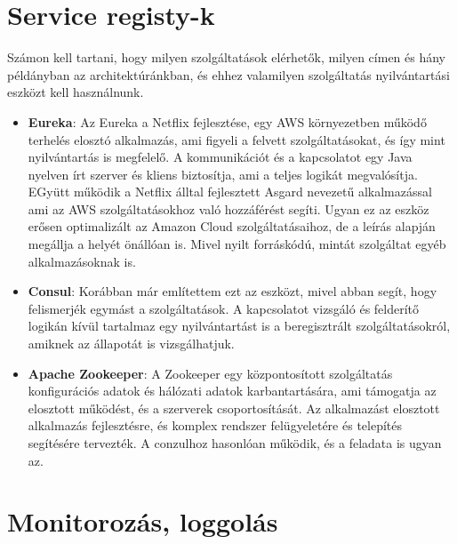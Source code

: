 \documentclass[11pt,magyar,a4paper,oneside,]{report}
\begin{document}
\section{\texorpdfstring{Service registy-k
\citep{service-registry-pattern}
\citep{micro-introPt3}}{Service registy-k {[}@service-registry-pattern{]} {[}@micro-introPt3{]}}}\label{service-registy-k-service-registry-pattern-micro-intropt3}

Számon kell tartani, hogy milyen szolgáltatások elérhetők, milyen címen
és hány példányban az architektúránkban, és ehhez valamilyen
szolgáltatás nyilvántartási eszközt kell használnunk.

\begin{itemize}
\item
  \textbf{Eureka}\citep{eureka-glance}: Az Eureka a Netflix fejlesztése,
  egy AWS környezetben működő terhelés elosztó alkalmazás, ami figyeli a
  felvett szolgáltatásokat, és így mint nyilvántartás is megfelelő. A
  kommunikációt és a kapcsolatot egy Java nyelven írt szerver és kliens
  biztosítja, ami a teljes logikát megvalósítja. EGyütt működik a
  Netflix álltal fejlesztett Asgard nevezetű alkalmazással ami az AWS
  szolgáltatásokhoz való hozzáférést segíti. Ugyan ez az eszköz erősen
  optimalizált az Amazon Cloud szolgáltatásaihoz, de a leírás alapján
  megállja a helyét önállóan is. Mivel nyilt forráskódú, mintát
  szolgáltat egyéb alkalmazásoknak is.
\item
  \textbf{Consul}: Korábban már említettem ezt az eszközt, mivel abban
  segít, hogy felismerjék egymást a szolgáltatások. A kapcsolatot
  vizsgáló és felderítő logikán kívül tartalmaz egy nyilvántartást is a
  beregisztrált szolgáltatásokról, amiknek az állapotát is
  vizsgálhatjuk.
\item
  \textbf{Apache Zookeeper}\citep{zookeeper}: A Zookeeper egy
  központosított szolgáltatás konfigurációs adatok és hálózati adatok
  karbantartására, ami támogatja az elosztott működést, és a szerverek
  csoportosítását. Az alkalmazást elosztott alkalmazás fejlesztésre, és
  komplex rendszer felügyeletére és telepítés segítésére tervezték. A
  conzulhoz hasonlóan működik, és a feladata is ugyan az.
\end{itemize}

\section{\texorpdfstring{Monitorozás, loggolás
\citep{micro-service-monitoring}
\citep{microservice-monitoring}}{Monitorozás, loggolás {[}@micro-service-monitoring{]} {[}@microservice-monitoring{]}}}\label{monitorozuxe1s-loggoluxe1s-micro-service-monitoring-microservice-monitoring}
\end{document}
